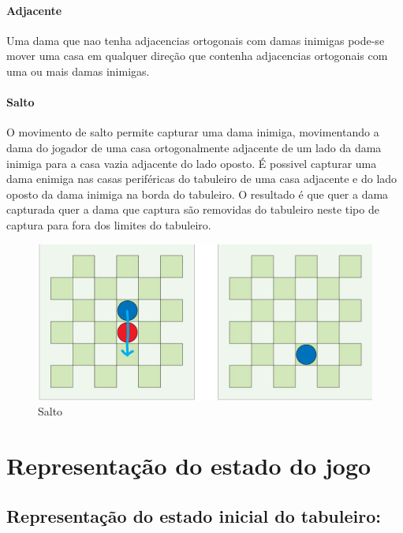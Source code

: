 \documentclass[a4paper,11pt]{article}
\begin{document}
\paragraph{Adjacente}
Uma dama que nao tenha adjacencias ortogonais com damas inimigas pode-se mover uma casa em qualquer direção que  contenha adjacencias ortogonais com uma ou mais damas inimigas.

\paragraph{Salto}
O movimento de salto permite capturar uma dama inimiga, movimentando a dama do jogador de uma casa ortogonalmente adjacente de um lado da dama inimiga para a casa vazia adjacente do lado oposto. É possivel capturar uma dama enimiga nas casas periféricas do tabuleiro de uma casa adjacente e do lado oposto da dama inimiga na borda do tabuleiro. O resultado é que quer a dama capturada quer a dama que captura são removidas do tabuleiro neste tipo de captura para fora dos limites do tabuleiro.

\begin{figure}[H]
    \centering
    \includegraphics[scale=0.55]{res/5-jump.jpg}
    \caption{Salto}
    \label{fig:5-jump.jpg}
\end{figure}

\section{Representação do estado do jogo}

\subsection{Representação do estado inicial do tabuleiro:}
\begin{verbatim}
\end{verbatim}
\end{document}
